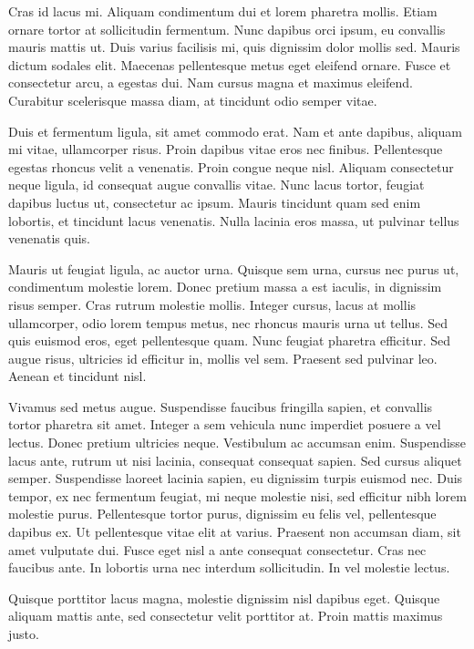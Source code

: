 \begin{agradecimentos}

Cras id lacus mi. Aliquam condimentum dui et lorem pharetra mollis. Etiam ornare tortor at sollicitudin fermentum. Nunc dapibus orci ipsum, eu convallis mauris mattis ut. Duis varius facilisis mi, quis dignissim dolor mollis sed. Mauris dictum sodales elit. Maecenas pellentesque metus eget eleifend ornare. Fusce et consectetur arcu, a egestas dui. Nam cursus magna et maximus eleifend. Curabitur scelerisque massa diam, at tincidunt odio semper vitae.

Duis et fermentum ligula, sit amet commodo erat. Nam et ante dapibus, aliquam mi vitae, ullamcorper risus. Proin dapibus vitae eros nec finibus. Pellentesque egestas rhoncus velit a venenatis. Proin congue neque nisl. Aliquam consectetur neque ligula, id consequat augue convallis vitae. Nunc lacus tortor, feugiat dapibus luctus ut, consectetur ac ipsum. Mauris tincidunt quam sed enim lobortis, et tincidunt lacus venenatis. Nulla lacinia eros massa, ut pulvinar tellus venenatis quis.

Mauris ut feugiat ligula, ac auctor urna. Quisque sem urna, cursus nec purus ut, condimentum molestie lorem. Donec pretium massa a est iaculis, in dignissim risus semper. Cras rutrum molestie mollis. Integer cursus, lacus at mollis ullamcorper, odio lorem tempus metus, nec rhoncus mauris urna ut tellus. Sed quis euismod eros, eget pellentesque quam. Nunc feugiat pharetra efficitur. Sed augue risus, ultricies id efficitur in, mollis vel sem. Praesent sed pulvinar leo. Aenean et tincidunt nisl.

Vivamus sed metus augue. Suspendisse faucibus fringilla sapien, et convallis tortor pharetra sit amet. Integer a sem vehicula nunc imperdiet posuere a vel lectus. Donec pretium ultricies neque. Vestibulum ac accumsan enim. Suspendisse lacus ante, rutrum ut nisi lacinia, consequat consequat sapien. Sed cursus aliquet semper. Suspendisse laoreet lacinia sapien, eu dignissim turpis euismod nec. Duis tempor, ex nec fermentum feugiat, mi neque molestie nisi, sed efficitur nibh lorem molestie purus. Pellentesque tortor purus, dignissim eu felis vel, pellentesque dapibus ex. Ut pellentesque vitae elit at varius. Praesent non accumsan diam, sit amet vulputate dui. Fusce eget nisl a ante consequat consectetur. Cras nec faucibus ante. In lobortis urna nec interdum sollicitudin. In vel molestie lectus.

Quisque porttitor lacus magna, molestie dignissim nisl dapibus eget. Quisque aliquam mattis ante, sed consectetur velit porttitor at. Proin mattis maximus justo.

\end{agradecimentos}